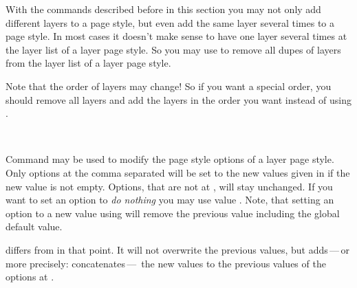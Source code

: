 \begin{Declaration}
\end{Declaration}
%
With the commands described before in this section you may not only add
different layers to a page style, but even add the same layer several times to
a page style. In most cases it doesn't make sense to have one layer several
times at the layer list of a layer page style. So you may use
 to remove all dupes of layers from the layer
list of a layer page style. 

Note that the order of layers may change! So if
you want a special order, you should remove all layers and add the layers in
the order you want instead of using .%

\begin{Declaration}
  \\
\end{Declaration}
%
%
Command  may be used to modify the page
style options of a layer page style. Only options at the comma separated
 will be set to the new values given in 
if the new value is not empty. Options, that are not at ,
will stay unchanged. If you want to set an option to \emph{do nothing} you may
use value . Note, that setting an option to a new value using
 will remove the previous value including
the global default value.

 differs from
 in that point. It will not overwrite the
previous values, but adds\,---\,or more precisely: concatenates\,---\, the new
values to the previous values of the options at .%
%
%

